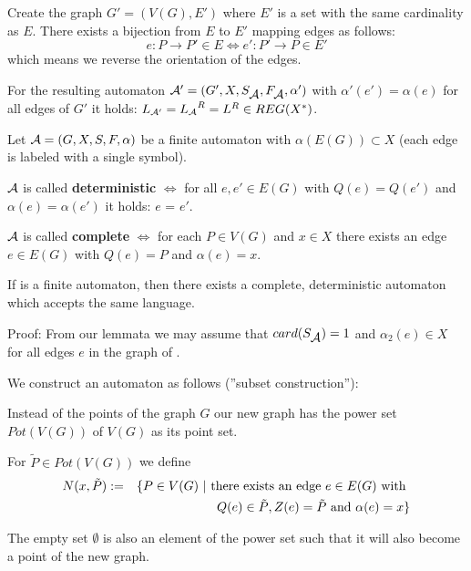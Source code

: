 Create the graph $G' = (V(G), E')$ where $E'$ is a set with the same cardinality
as $E$. There exists a bijection from $E$ to $E'$ mapping edges as follows:
\[ e : P \to P' \in E \Leftrightarrow e' : P' \to P \in E' \]
which means we reverse the orientation of the edges.

For the resulting automaton $\mbox{$\mathcal{A'}$} = (G', X, S_{\mbox{$\mathcal{A}$}},
F_{\mbox{$\mathcal{A}$}}, \alpha')$ with $\alpha'(e') = \alpha(e)$ for all edges of $G'$
it holds: $\mbox{$L_{\mathcal{A'}}$} = \mbox{$L_{\mathcal{A}}$}^R = L^R \in REG(X^*)$.

\begin{definition}
Let $\mbox{$\mathcal{A}$} = (G, X, S, F, \alpha)$ be a finite automaton with
$\alpha(E(G)) \subset X$ (each edge is labeled with a single
symbol).

$\mbox{$\mathcal{A}$}$ is called {\bf deterministic} $\Leftrightarrow$ for all $e, e'
\in E(G)$ with $Q(e) = Q(e')$ and $\alpha(e) = \alpha(e')$ it holds: $e$ = $e'$.

$\mbox{$\mathcal{A}$}$ is called {\bf complete} $\Leftrightarrow$ for each $P \in V(G)$
and $x \in X$ there exists an edge $e \in E(G)$ with $Q(e) = P$ and $\alpha(e)
= x$.
\end{definition}

\begin{theorem}
If  is a finite automaton, then there exists a complete,
deterministic automaton  which accepts the same language.
\end{theorem}

Proof: From our lemmata we may assume that $card(S_{\mbox{$\mathcal{A}$}}) = 1$ and
$\alpha_2(e) \in X$ for all edges $e$ in the graph of .

We construct an automaton  as follows (''subset construction''):

Instead of the points of the graph $G$ our new graph has the power set
$Pot(V(G))$ of $V(G)$ as its point set.

For $\tilde{P} \in Pot(V(G))$ we define 
\begin{eqnarray*}
& N(x, \tilde{P}) := & \{ P \in V(G) \ |\  \mbox{there exists an edge } e \in
E(G) \mbox{ with } \\
& & \ Q(e) \in \tilde{P}, Z(e) = \tilde{P} \mbox{ and } \alpha(e) = x \} 
\end{eqnarray*}

The empty set $\emptyset$ is also an element of the power set such that it will
also become a point of the new graph.


